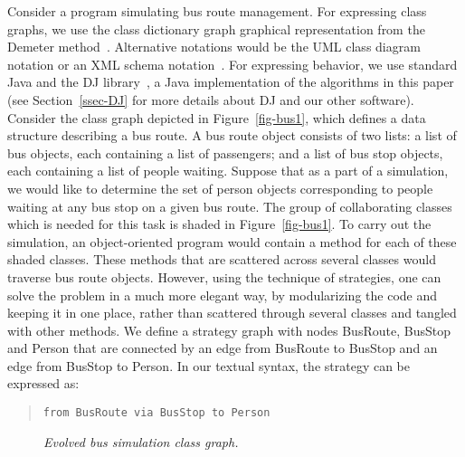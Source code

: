 Consider a program simulating bus route management.  For expressing
class graphs, we use the class dictionary graph graphical
representation from the Demeter method~\cite{karl:demeter}.
Alternative notations would be the UML class diagram notation
\cite{rational:UML-LUG} or an XML schema notation~\cite{URL:XMLschema}.
For expressing behavior, we use standard Java and the DJ
library~\cite{OrleansLieberherrReflection01,
adaptive-methods-cacm-2001, URL:demeter}, a Java implementation of the
algorithms in this paper (see Section~\ref{ssec-DJ} for more details
about DJ and our other software).  Consider the class graph depicted
in Figure~\ref{fig-bus1}, which defines a data structure describing a
bus route. A bus route object consists of two lists: a list of bus
objects, each containing a list of passengers; and a list of bus stop
objects, each containing a list of people waiting.  Suppose that as a
part of a simulation, we would like to determine the set of person
objects corresponding to people waiting at any bus stop on a given bus
route.  The group of collaborating classes which is needed for this
task is shaded in Figure~\ref{fig-bus1}. To carry out the simulation,
an object-oriented program would contain a method for each of these
shaded classes.  These methods that are scattered across several
classes would traverse bus route objects.  However, using the
technique of strategies, one can solve the problem in a much more
elegant way, by modularizing the code and keeping it in one place,
rather than scattered through several classes and tangled with other
methods.  We define a strategy graph with nodes {\sf BusRoute}, {\sf
BusStop} and {\sf Person} that are connected by an edge from {\sf
BusRoute} to {\sf BusStop} and an edge from {\sf BusStop} to {\sf
Person}.
In our textual syntax, the strategy can be expressed as:
\begin{quote}
\texttt{from BusRoute via BusStop to Person}
\end{quote}

\begin{figure}
\centerline{}
\caption{\em Evolved bus simulation class graph.}
\label{fig-bus2}
\end{figure}
\noindent


